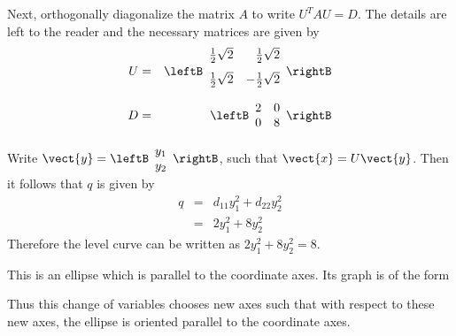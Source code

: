 \begin{solution}
Next, orthogonally diagonalize the matrix $A$ to write $U^TAU = D$. The details are left to the reader and the necessary matrices are given by 
\begin{eqnarray*}
U &=& \leftB \begin{array}{rr}
\vspace{0.05in}\frac{1}{2}\sqrt{2} & \vspace{0.05in}\frac{1}{2}\sqrt{2} \\
\vspace{0.05in}\frac{1}{2}\sqrt{2} & -\vspace{0.05in}\frac{1}{2}\sqrt{2}
\end{array}
\rightB \\
D &=& 
\leftB \begin{array}{rr}
2 & 0 \\
0 & 8 
\end{array}
\rightB
\end{eqnarray*}

Write $\vect{y} = \leftB \begin{array}{r}
y_1 \\
y_2 
\end{array} \rightB$, such that $\vect{x} = U \vect{y}$. Then it follows that $q$ is given by 
\begin{eqnarray*}
q &=& d_{11}y_1^2 + d_{22}y_2^2 \\
&=& 2y_1^{2}+8y_2^{2}
\end{eqnarray*}
Therefore the level curve can be written as $2y_1^{2}+8y_2^{2}=8$. 

This is an ellipse which is parallel to the coordinate axes. Its graph is of
the form

\begin{center}
\end{center}

\noindent Thus this change of variables chooses new axes  such that with respect to these new axes, the
ellipse is oriented parallel to the coordinate axes.
\end{solution}